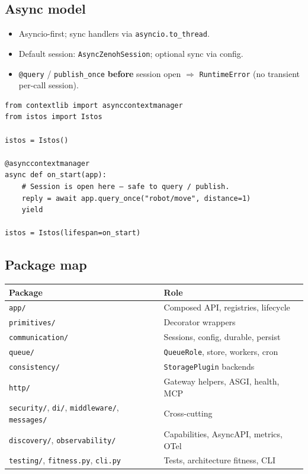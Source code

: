 \documentclass[11pt,a4paper]{article}
\begin{document}
\subsection{Async model}

\begin{itemize}[leftmargin=*]
  \item Asyncio-first; sync handlers via \texttt{asyncio.to\_thread}.
  \item Default session: \texttt{AsyncZenohSession}; optional sync via config.
  \item \texttt{@query} / \texttt{publish\_once} \textbf{before} session open
        $\Rightarrow$ \texttt{RuntimeError} (no transient per-call session).
\end{itemize}

\begin{lstlisting}
from contextlib import asynccontextmanager
from istos import Istos

istos = Istos()

@asynccontextmanager
async def on_start(app):
    # Session is open here — safe to query / publish.
    reply = await app.query_once("robot/move", distance=1)
    yield

istos = Istos(lifespan=on_start)
\end{lstlisting}

\subsection{Package map}

\begin{tabularx}{\textwidth}{@{}lX@{}}
\toprule
\textbf{Package} & \textbf{Role} \\
\midrule
\texttt{app/} & Composed API, registries, lifecycle \\
\texttt{primitives/} & Decorator wrappers \\
\texttt{communication/} & Sessions, config, durable, persist \\
\texttt{queue/} & \texttt{QueueRole}, store, workers, cron \\
\texttt{consistency/} & \texttt{StoragePlugin} backends \\
\texttt{http/} & Gateway helpers, ASGI, health, MCP \\
\texttt{security/}, \texttt{di/}, \texttt{middleware/}, \texttt{messages/} & Cross-cutting \\
\texttt{discovery/}, \texttt{observability/} & Capabilities, AsyncAPI, metrics, OTel \\
\texttt{testing/}, \texttt{fitness.py}, \texttt{cli.py} & Tests, architecture fitness, CLI \\
\bottomrule
\end{tabularx}
\end{document}
